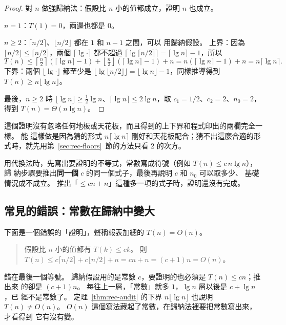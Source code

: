 \begin{proof}
對 $n$ 做強歸納法：假設比 $n$ 小的值都成立，證明 $n$ 也成立。

$n = 1$：$T(1) = 0$，兩邊也都是 $0$。

$n \ge 2$：$\lceil n/2 \rceil$、$\lfloor n/2 \rfloor$ 都在 $1$ 和 $n - 1$ 之間，可以
用歸納假設。 上界：因為 $\lfloor n/2 \rfloor \le \lceil n/2 \rceil$，兩個
$\lceil \lg \cdot \rceil$ 都不超過 $\lceil \lg \lceil n/2 \rceil \rceil =
\lceil \lg n \rceil - 1$，所以
\[
T(n) \le \left\lceil \tfrac{n}{2} \right\rceil (\lceil \lg n \rceil - 1)
+ \left\lfloor \tfrac{n}{2} \right\rfloor (\lceil \lg n \rceil - 1) + n
= n(\lceil \lg n \rceil - 1) + n = n \lceil \lg n \rceil.
\]
下界：兩個 $\lfloor \lg \cdot \rfloor$ 都至少是
$\lfloor \lg \lfloor n/2 \rfloor \rfloor = \lfloor \lg n \rfloor - 1$，同樣推導得到
$T(n) \ge n \lfloor \lg n \rfloor$。

最後，$n \ge 2$ 時 $\lfloor \lg n \rfloor \ge \frac{1}{2} \lg n$、$\lceil \lg n \rceil
\le 2 \lg n$，取 $c_1 = 1/2$、$c_2 = 2$、$n_0 = 2$，得到 $T(n) = \Theta(n \lg n)$。
\end{proof}

這個證明沒有忽略任何地板或天花板，而且得到的上下界和程式印出的兩欄完全一樣。 能
這樣做是因為猜的形式 $n \lceil \lg n \rceil$ 剛好和天花板配合；猜不出這麼合適的形
式時，就先用第~\ref{sec:rec-floors}~節的方法只看 $2$ 的次方。

\begin{examnote}
用代換法時，先寫出要證明的不等式，常數寫成符號（例如 $T(n) \le c\, n \lg n$），歸
納步驟要推出\textbf{同一個} $c$ 的同一個式子，最後再說明 $c$ 和 $n_0$ 可以取多少、
基礎情況成不成立。 推出「$\le cn + n$」這種多一項的式子時，證明還沒有完成。
\end{examnote}

\subsection{常見的錯誤：常數在歸納中變大}

下面是一個錯誤的「證明」，聲稱報表加總的 $T(n) = O(n)$。

\begin{quote}
假設比 $n$ 小的值都有 $T(k) \le ck$。 則
$T(n) \le c \lceil n/2 \rceil + c \lfloor n/2 \rfloor + n = cn + n = (c + 1) n =
O(n)$。
\end{quote}

錯在最後一個等號。 歸納假設用的是常數 $c$，要證明的也必須是 $T(n) \le cn$；推出來
的卻是 $(c + 1)n$。 每往上一層，「常數」就多 $1$，$\lg n$ 層以後是 $c + \lg n$，已
經不是常數了。 定理~\ref{thm:rec-audit} 的下界 $n \lfloor \lg n \rfloor$ 也說明
$T(n) \ne O(n)$。 $O(n)$ 這個寫法藏起了常數，在歸納法裡要把常數寫出來，才看得到
它有沒有變。

